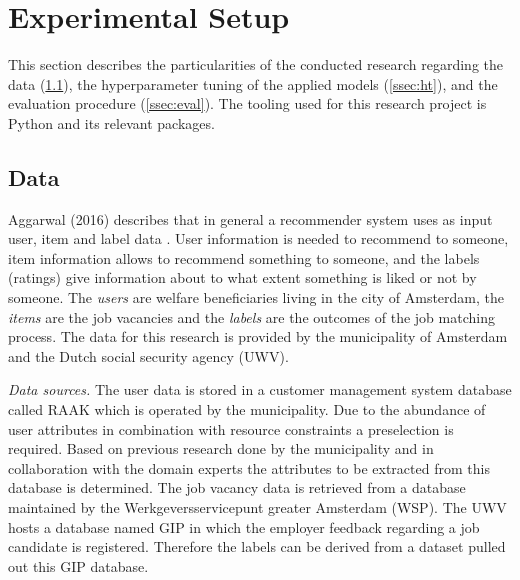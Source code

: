 \section{Experimental Setup}
\label{sec:setup}
This section describes the particularities of the conducted research regarding the data (\ref{ssec:data}), the hyperparameter tuning of the applied models (\ref{ssec:ht}), and the evaluation procedure (\ref{ssec:eval}). 
The tooling used for this research project is Python and its relevant packages.

\subsection{Data}
\label{ssec:data}
Aggarwal (2016) describes that in general a recommender system uses as input user, item and label data \cite{aggarwal2016recommender}.
User information is needed to recommend to someone, item information allows to recommend something to someone, and the labels (ratings) give information about to what extent  something is liked or not by someone.
The \textit{users} are welfare beneficiaries living in the city of Amsterdam, the \textit{items} are the job vacancies and the \textit{labels} are the outcomes of the job matching process.
The data for this research is provided by the municipality of Amsterdam and the Dutch social security agency (UWV).

\textit{Data sources.}
The user data is stored in a customer management system database called RAAK which is operated by the municipality.
Due to the abundance of user attributes in combination with resource constraints a preselection is required. 
Based on previous research done by the municipality and in collaboration with the domain experts the attributes to be extracted from this database is determined. 
The job vacancy data is retrieved from a database maintained by the Werkgeversservicepunt greater Amsterdam (WSP).
The UWV hosts a database named GIP in which the employer feedback regarding a job candidate is registered.
Therefore the labels can be derived from a dataset pulled out this GIP database.

